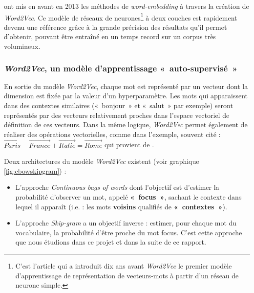 \documentclass[11pt,french,french]{article}
\let\rmarkdownfootnote\footnote%
\def\footnote{\protect\rmarkdownfootnote}
\begin{document}
\cite{Mikolov} ont mis en avant en 2013 les méthodes de \emph{word-embedding} à travers la création de \emph{Word2Vec}. Ce modèle de réseaux de neurones\footnote{C'est l'article \cite{Bengio} qui a introduit dix ans avant \emph{Word2Vec} le premier modèle d'apprentissage de représentation de vecteurs-mots à partir d'un réseau de neurone simple.} à deux couches est rapidement devenu une référence grâce à la grande précision des résultats qu'il permet d'obtenir, pouvant être entraîné en un temps record sur un corpus très volumineux.

\hypertarget{subsec:word2vec}{%
\subsubsection{\texorpdfstring{\emph{Word2Vec}, un modèle d'apprentissage «~auto-supervisé~»}{Word2Vec, un modèle d'apprentissage «~auto-supervisé~»}}\label{subsec:word2vec}}

En sortie du modèle \emph{Word2Vec}, chaque mot est représenté par un vecteur dont la dimension est fixée par la valeur d'un hyperparamètre. Les mots qui apparaissent dans des contextes similaires («~bonjour~» et «~salut~» par exemple) seront représentés par des vecteurs relativement proches dans l'espace vectoriel de définition de ces vecteurs. Dans la même logique, \emph{Word2Vec} permet également de réaliser des opérations vectorielles, comme dans l'exemple, souvent cité : \(\overrightarrow{Paris} - \overrightarrow{France} + \overrightarrow{Italie} = \overrightarrow{Rome}\) qui provient de \cite{Mikolov}.

Deux architectures du modèle \emph{Word2Vec} existent (voir graphique \ref{fig:cbowskipgram}) :

\begin{itemize}
\item
  L'approche \emph{Continuous bags of words} dont l'objectif est d'estimer la probabilité d'observer un mot, appelé \textbf{«~focus~»}, sachant le contexte dans lequel il apparaît (i.e. : les mots \textbf{voisins} qualifiés de \textbf{«~contextes~»}).
\item
  L'approche \emph{Skip-gram} a un objectif inverse : estimer, pour chaque mot du vocabulaire, la probabilité d'être proche du mot focus.
  C'est cette approche que nous étudions dans ce projet et dans la suite de ce rapport.
\end{itemize}
\end{document}
